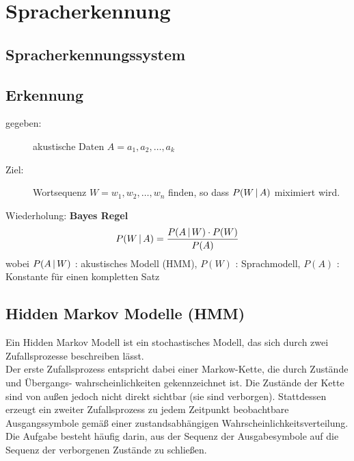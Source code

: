 
\section{Spracherkennung}

\subsection{Spracherkennungssystem}




\subsection{Erkennung}

\begin{description}
\item[gegeben:] akustische Daten $A = a_1,a_2,\dots,a_k$
\item[Ziel:] Wortsequenz $W = w_1,w_2,\dots,w_n$ finden, so dass $P(W \, | \, A)$ miximiert wird.
\end{description}

Wiederholung: \textbf{Bayes Regel} $$P(W \, | \, A) = \frac{P(A \, | \, W) \cdot P(W)}{P(A)}$$ wobei $P(A \, | \, W)$ : akustisches Modell (HMM), $P(W)$ : Sprachmodell, $P(A)$ : Konstante für einen kompletten Satz

\subsection{Hidden Markov Modelle (HMM)}

Ein Hidden Markov Modell ist ein stochastisches Modell, das sich durch zwei Zufallsprozesse beschreiben lässt. \\
Der erste Zufallsprozess entspricht dabei einer Markow-Kette, die durch Zustände und Übergangs- wahrscheinlichkeiten gekennzeichnet ist. Die Zustände der Kette sind von außen jedoch nicht direkt sichtbar (sie sind verborgen). Stattdessen erzeugt ein zweiter Zufallsprozess zu jedem Zeitpunkt beobachtbare Ausgangssymbole gemäß einer zustandsabhängigen Wahrscheinlichkeitsverteilung. Die Aufgabe besteht häufig darin, aus der Sequenz der Ausgabesymbole auf die Sequenz der verborgenen Zustände zu schließen.

